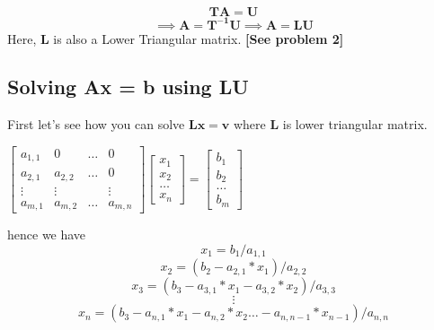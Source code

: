 \documentclass[a4paper]{article}
\begin{document}
        \begin{equation*}
            \mathbf{TA} = \mathbf{U}
        \end{equation*}
        \begin{equation*}
            \implies \mathbf{A} = \mathbf{T^{-1}U}
            \implies \mathbf{A} = \mathbf{LU}
        \end{equation*}
        Here, $\mathbf{L}$ is also a Lower Triangular matrix. \textbf{[See problem 2]}
    \subsection{Solving Ax = b using LU}
        First let's see how you can solve $\mathbf{Lx = v}$ where $\mathbf{L}$ is lower triangular matrix. 
        \begin{center}
        $
         \begin{bmatrix}
                a_{1,1} & 0 & \dots & 0 \\ 
                a_{2,1} & a_{2,2} & \dots & 0 \\
                \vdots  & \vdots  &       & \vdots  \\
                a_{m,1} & a_{m,2} & \dots & a_{m,n} 
        \end{bmatrix}
        \begin{bmatrix}
                x_1 \\
                x_2 \\
                \dots \\
                x_n
        \end{bmatrix}
                 = 
                \begin{bmatrix}
                b_1   \\
                b_2   \\
                \dots \\
                b_m
                \end{bmatrix}
        $
        \end{center}
        hence we have 
        \begin{equation*}
            x_1 = b_1/a_{1,1} 
        \end{equation*}
        \begin{equation*}
            x_2 = (b_2-a_{2,1}*x_1)/a_{2,2} 
        \end{equation*}
         \begin{equation*}
            x_3 = (b_3-a_{3,1}*x_1-a_{3,2}*x_2)/a_{3,3} 
        \end{equation*}
        \begin{equation*}
            \vdots
        \end{equation*}
         \begin{equation*}
            x_n = (b_3-a_{n,1}*x_1-a_{n,2}*x_2\dots-a_{n,n-1}*x_{n-1})/a_{n,n}
        \end{equation*}
        
\end{document}
